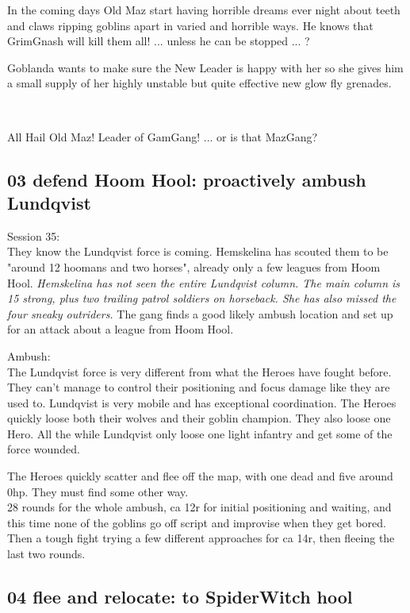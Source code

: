 In the coming days Old Maz start having horrible dreams ever night about teeth and claws ripping goblins apart in varied and horrible ways. He knows that GrimGnash will kill them all! ... unless he can be stopped ... ?

Goblanda wants to make sure the New Leader is happy with her so she gives him a small supply of her highly unstable but quite effective new glow fly grenades.

\

\noindent All Hail Old Maz! Leader of GamGang! ... or is that MazGang?


\subsection*{03 defend Hoom Hool: proactively ambush Lundqvist}

\forceindent Session 35:\\                                              %
They know the Lundqvist force is coming. Hemskelina has scouted them to be "around 12 hoomans and two horses", already only a few leagues from Hoom Hool.
\emph{Hemskelina has not seen the entire Lundqvist column. The main column is 15 strong, plus two trailing patrol soldiers on horseback. She has also missed the four sneaky outriders.}
The gang finds a good likely ambush location and set up for an attack about a league from Hoom Hool.

Ambush:\\
The Lundqvist force is very different from what the Heroes have fought before. They can't manage to control their positioning and focus damage like they are used to. Lundqvist is very mobile and has exceptional coordination. The Heroes quickly loose both their wolves and their goblin champion. They also loose one Hero. All the while Lundqvist only loose one light infantry and get some of the force wounded.

The Heroes quickly scatter and flee off the map, with one dead and five around 0hp. They must find some other way.\\
28 rounds for the whole ambush, ca 12r for initial positioning and waiting, and this time none of the goblins go off script and improvise when they get bored. Then a tough fight trying a few different approaches for ca 14r, then fleeing the last two rounds.


\subsection*{04 flee and relocate: to SpiderWitch hool}

